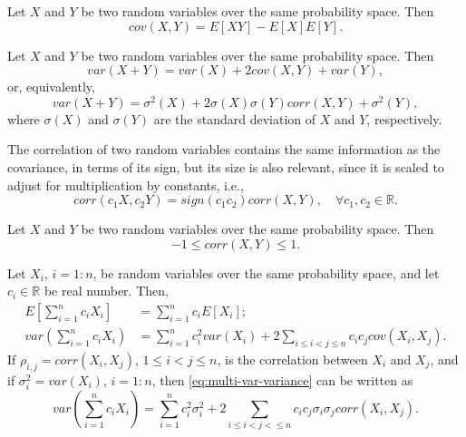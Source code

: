 \begin{lemma}
    Let $ X $ and $ Y $ be two random variables over the same probability space.
    Then
    \begin{equation}
        cov(X, Y) = E[XY] - E[X]E[Y].
    \end{equation}
\end{lemma}

\begin{lemma}
    Let $ X $ and $ Y $ be two random variables over the same probability space.
    Then
    \begin{equation}
        var(X + Y) = var(X) + 2 cov(X, Y) + var(Y),
    \end{equation}
    or, equivalently,
    \begin{equation}
        var(X + Y) = \sigma^2(X) + 2 \sigma(X) \sigma(Y) corr(X, Y) +
            \sigma^2(Y),
    \end{equation}
    where $ \sigma(X) $ and $ \sigma(Y) $ are the standard deviation of $ X $
        and $ Y $, respectively.
\end{lemma}

The correlation of two random variables contains the same information as the
    covariance, in terms of its sign, but its size is also relevant, since it
    is scaled to adjust for multiplication by constants, i.e.,
\begin{equation}
    corr(c_1 X, c_2 Y) = sign(c_1 c_2) corr(X, Y), \quad
        \forall c_1, c_2 \in \mathbb{R}.
\end{equation}

\begin{lemma}
    Let $ X $ and $ Y $ be two random variables over the same probability space.
    Then
    \begin{equation}
        -1 \leq corr(X, Y) \leq 1.
    \end{equation}
\end{lemma}

\begin{lemma}
    Let $ X_i $, $ i = 1 : n $, be random variables over the same probability
        space, and let $ c_i \in \mathbb{R} $ be real number.
    Then,
    \begin{align}
        E \left[ \sum_{i=1}^{n} c_i X_i \right] &=
            \sum_{i=1}^{n} c_i E[X_i]; \\
        var \left( \sum_{i=1}^{n} c_i X_i \right) &=
            \sum_{i=1}^{n} c_i^2 var(X_i) + 2 \sum_{i \leq i < j \leq n}
            c_i c_j cov(X_i, X_j).
        \label{eq:multi-var-variance}
    \end{align}
    If $ \rho_{i, j} = corr(X_i, X_j) $, $ 1 \leq i < j \leq n $, is the
        correlation between $ X_i $ and $ X_j $, and if
        $ \sigma_i^2 = var(X_i) $, $ i = 1 : n $, then
        \eqref{eq:multi-var-variance} can be written as
    \begin{equation}
        var \left( \sum_{i=1}^{n} c_i X_i \right) =
            \sum_{i=1}^{n} c_i^2 \sigma_i^2 +
            2 \sum_{i \leq i < j < \leq n} c_i c_j \sigma_i \sigma_j
            corr(X_i, X_j).
    \end{equation}
\end{lemma}

